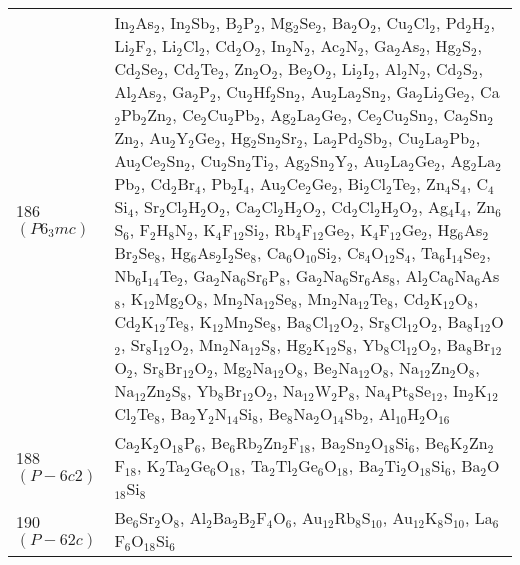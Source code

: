 {\begin{longtable}{p{7.315em}|p{40em}}
    186 $(P6_3mc)$ & In$_{2}$As$_{2}$, In$_{2}$Sb$_{2}$, B$_{2}$P$_{2}$, Mg$_{2}$Se$_{2}$, Ba$_{2}$O$_{2}$, Cu$_{2}$Cl$_{2}$, Pd$_{2}$H$_{2}$, Li$_{2}$F$_{2}$, Li$_{2}$Cl$_{2}$, Cd$_{2}$O$_{2}$, In$_{2}$N$_{2}$, Ac$_{2}$N$_{2}$, Ga$_{2}$As$_{2}$, Hg$_{2}$S$_{2}$, Cd$_{2}$Se$_{2}$, Cd$_{2}$Te$_{2}$, Zn$_{2}$O$_{2}$, Be$_{2}$O$_{2}$, Li$_{2}$I$_{2}$, Al$_{2}$N$_{2}$, Cd$_{2}$S$_{2}$, Al$_{2}$As$_{2}$, Ga$_{2}$P$_{2}$, Cu$_{2}$Hf$_{2}$Sn$_{2}$, Au$_{2}$La$_{2}$Sn$_{2}$, Ga$_{2}$Li$_{2}$Ge$_{2}$, Ca$_{2}$Pb$_{2}$Zn$_{2}$, Ce$_{2}$Cu$_{2}$Pb$_{2}$, Ag$_{2}$La$_{2}$Ge$_{2}$, Ce$_{2}$Cu$_{2}$Sn$_{2}$, Ca$_{2}$Sn$_{2}$Zn$_{2}$, Au$_{2}$Y$_{2}$Ge$_{2}$, Hg$_{2}$Sn$_{2}$Sr$_{2}$, La$_{2}$Pd$_{2}$Sb$_{2}$, Cu$_{2}$La$_{2}$Pb$_{2}$, Au$_{2}$Ce$_{2}$Sn$_{2}$, Cu$_{2}$Sn$_{2}$Ti$_{2}$, Ag$_{2}$Sn$_{2}$Y$_{2}$, Au$_{2}$La$_{2}$Ge$_{2}$, Ag$_{2}$La$_{2}$Pb$_{2}$, Cd$_{2}$Br$_{4}$, Pb$_{2}$I$_{4}$, Au$_{2}$Ce$_{2}$Ge$_{2}$, Bi$_{2}$Cl$_{2}$Te$_{2}$, Zn$_{4}$S$_{4}$, C$_{4}$Si$_{4}$, Sr$_{2}$Cl$_{2}$H$_{2}$O$_{2}$, Ca$_{2}$Cl$_{2}$H$_{2}$O$_{2}$, Cd$_{2}$Cl$_{2}$H$_{2}$O$_{2}$, Ag$_{4}$I$_{4}$, Zn$_{6}$S$_{6}$, F$_{2}$H$_{8}$N$_{2}$, K$_{4}$F$_{12}$Si$_{2}$, Rb$_{4}$F$_{12}$Ge$_{2}$, K$_{4}$F$_{12}$Ge$_{2}$, Hg$_{6}$As$_{2}$Br$_{2}$Se$_{8}$, Hg$_{6}$As$_{2}$I$_{2}$Se$_{8}$, Ca$_{6}$O$_{10}$Si$_{2}$, Cs$_{4}$O$_{12}$S$_{4}$, Ta$_{6}$I$_{14}$Se$_{2}$, Nb$_{6}$I$_{14}$Te$_{2}$, Ga$_{2}$Na$_{6}$Sr$_{6}$P$_{8}$, Ga$_{2}$Na$_{6}$Sr$_{6}$As$_{8}$, Al$_{2}$Ca$_{6}$Na$_{6}$As$_{8}$, K$_{12}$Mg$_{2}$O$_{8}$, Mn$_{2}$Na$_{12}$Se$_{8}$, Mn$_{2}$Na$_{12}$Te$_{8}$, Cd$_{2}$K$_{12}$O$_{8}$, Cd$_{2}$K$_{12}$Te$_{8}$, K$_{12}$Mn$_{2}$Se$_{8}$, Ba$_{8}$Cl$_{12}$O$_{2}$, Sr$_{8}$Cl$_{12}$O$_{2}$, Ba$_{8}$I$_{12}$O$_{2}$, Sr$_{8}$I$_{12}$O$_{2}$, Mn$_{2}$Na$_{12}$S$_{8}$, Hg$_{2}$K$_{12}$S$_{8}$, Yb$_{8}$Cl$_{12}$O$_{2}$, Ba$_{8}$Br$_{12}$O$_{2}$, Sr$_{8}$Br$_{12}$O$_{2}$, Mg$_{2}$Na$_{12}$O$_{8}$, Be$_{2}$Na$_{12}$O$_{8}$, Na$_{12}$Zn$_{2}$O$_{8}$, Na$_{12}$Zn$_{2}$S$_{8}$, Yb$_{8}$Br$_{12}$O$_{2}$, Na$_{12}$W$_{2}$P$_{8}$, Na$_{4}$Pt$_{8}$Se$_{12}$, In$_{2}$K$_{12}$Cl$_{2}$Te$_{8}$, Ba$_{2}$Y$_{2}$N$_{14}$Si$_{8}$, Be$_{8}$Na$_{2}$O$_{14}$Sb$_{2}$, Al$_{10}$H$_{2}$O$_{16}$ \\
    188 $(P-6c2)$ & Ca$_{2}$K$_{2}$O$_{18}$P$_{6}$, Be$_{6}$Rb$_{2}$Zn$_{2}$F$_{18}$, Ba$_{2}$Sn$_{2}$O$_{18}$Si$_{6}$, Be$_{6}$K$_{2}$Zn$_{2}$F$_{18}$, K$_{2}$Ta$_{2}$Ge$_{6}$O$_{18}$, Ta$_{2}$Tl$_{2}$Ge$_{6}$O$_{18}$, Ba$_{2}$Ti$_{2}$O$_{18}$Si$_{6}$, Ba$_{2}$O$_{18}$Si$_{8}$ \\
    190 $(P-62c)$ & Be$_{6}$Sr$_{2}$O$_{8}$, Al$_{2}$Ba$_{2}$B$_{2}$F$_{4}$O$_{6}$, Au$_{12}$Rb$_{8}$S$_{10}$, Au$_{12}$K$_{8}$S$_{10}$, La$_{6}$F$_{6}$O$_{18}$Si$_{6}$ \\

\end{longtable}}
